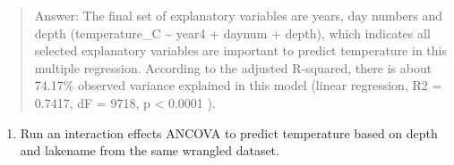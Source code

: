 \documentclass[]{article}
\newenvironment{Shaded}{\begin{snugshade}}{\end{snugshade}}
\newcommand{\KeywordTok}[1]{\textcolor[rgb]{0.13,0.29,0.53}{\textbf{#1}}}
\newcommand{\DataTypeTok}[1]{\textcolor[rgb]{0.13,0.29,0.53}{#1}}
\newcommand{\StringTok}[1]{\textcolor[rgb]{0.31,0.60,0.02}{#1}}
\newcommand{\CommentTok}[1]{\textcolor[rgb]{0.56,0.35,0.01}{\textit{#1}}}
\newcommand{\OperatorTok}[1]{\textcolor[rgb]{0.81,0.36,0.00}{\textbf{#1}}}
\newcommand{\NormalTok}[1]{#1}
\providecommand{\tightlist}{%
  \setlength{\itemsep}{0pt}\setlength{\parskip}{0pt}}
\begin{document}
\begin{quote}
Answer: The final set of explanatory variables are years, day numbers
and depth (temperature\_C \textasciitilde{} year4 + daynum + depth),
which indicates all selected explanatory variables are important to
predict temperature in this multiple regression. According to the
adjusted R-squared, there is about 74.17\% observed variance explained
in this model (linear regression, R2 = 0.7417, dF = 9718, p \textless{}
0.0001 ).
\end{quote}

\begin{enumerate}
\def\labelenumi{\arabic{enumi}.}
\setcounter{enumi}{5}
\tightlist
\item
  Run an interaction effects ANCOVA to predict temperature based on
  depth and lakename from the same wrangled dataset.
\end{enumerate}

\begin{Shaded}
\end{Shaded}
\end{document}
